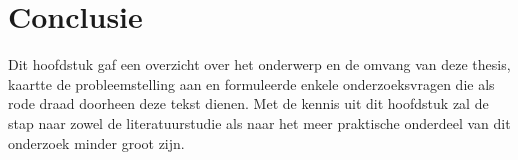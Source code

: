\section{Conclusie}
Dit hoofdstuk gaf een overzicht over het onderwerp en de omvang van deze thesis, kaartte de probleemstelling aan en formuleerde enkele onderzoeksvragen die als rode draad doorheen deze tekst dienen. Met de kennis uit dit hoofdstuk zal de stap naar zowel de literatuurstudie als naar het meer praktische onderdeel van dit onderzoek minder groot zijn.
